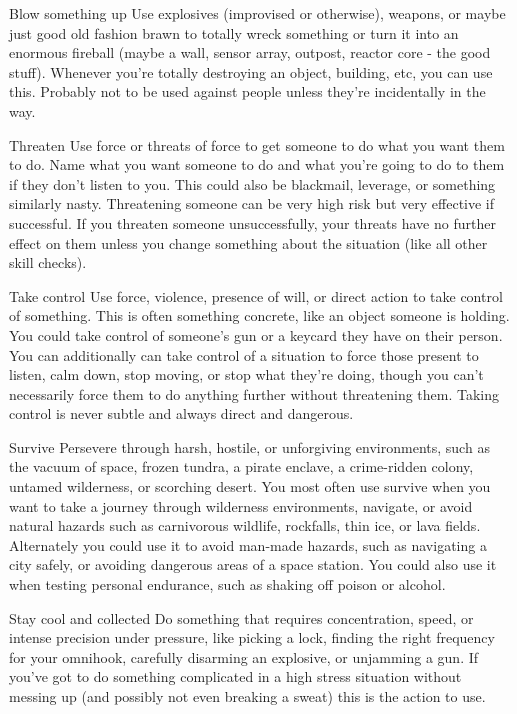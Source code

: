 Blow something up  
Use explosives (improvised or otherwise), weapons, or maybe just good old fashion brawn to  
totally wreck something or turn it into an enormous fireball (maybe a wall, sensor array, outpost,  
reactor core - the good stuff). Whenever you’re totally destroying an object, building, etc, you can  
use this. Probably not to be used against people unless they’re incidentally in the way.  

Threaten  
Use force or threats of force to get someone to do what you want them to do. Name what you  
want someone to do and what you’re going to do to them if they don’t listen to you. This could  
also be blackmail, leverage, or something similarly nasty. Threatening someone can be very high  
risk but very effective if successful. If you threaten someone unsuccessfully, your threats have no  
further effect on them unless you change something about the situation (like all other skill checks).  

Take control  
Use force, violence, presence of will, or direct action to take control of something. This is often  
something concrete, like an object someone is holding. You could take control of someone’s gun  
or a keycard they have on their person. You can additionally can take control of a situation to force  
those present to listen, calm down, stop moving, or stop what they’re doing, though you can’t  
necessarily force them to do anything further without threatening them. Taking control is never  
subtle and always direct and dangerous.  

Survive  
Persevere through harsh, hostile, or unforgiving environments, such as the vacuum of space,  
frozen tundra, a pirate enclave, a crime-ridden colony, untamed wilderness, or scorching desert.  
You most often use survive when you want to take a journey through wilderness environments,  
navigate, or avoid natural hazards such as carnivorous wildlife, rockfalls, thin ice, or lava fields.  
Alternately you could use it to avoid man-made hazards, such as navigating a city safely, or  
avoiding dangerous areas of a space station. You could also use it when testing personal  
endurance, such as shaking off poison or alcohol.  

Stay cool and collected  
Do something that requires concentration, speed, or intense precision under pressure, like picking  
a lock, finding the right frequency for your omnihook, carefully disarming an explosive, or  
unjamming a gun. If you’ve got to do something complicated in a high stress situation without  
messing up (and possibly not even breaking a sweat) this is the action to use.  

